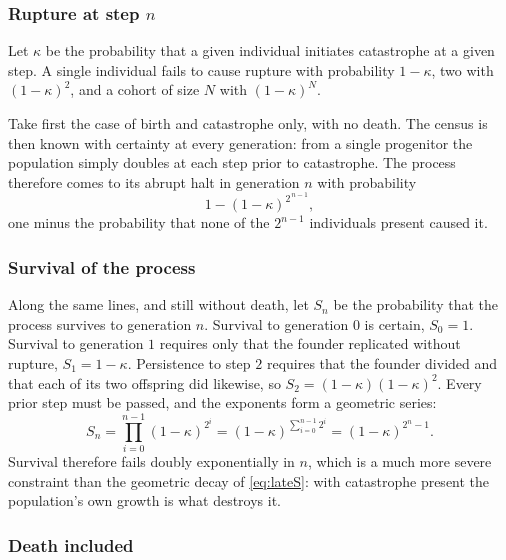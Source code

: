 \subsubsection*{Rupture at step \texorpdfstring{$n$}{n}}

Let $\kappa$ be the probability that a given individual initiates catastrophe at a given
step. A single individual fails to cause rupture with probability $1-\kappa$, two with
$(1-\kappa)^2$, and a cohort of size $N$ with $(1-\kappa)^N$.

Take first the case of birth and catastrophe only, with no death. The census is then
known with certainty at every generation: from a single progenitor the population simply
doubles at each step prior to catastrophe. The process therefore comes to its abrupt halt
in generation $n$ with probability
\begin{equation}
\label{eq:bdcrupture}
1-(1-\kappa)^{2^{\,n-1}},
\end{equation}
one minus the probability that none of the $2^{n-1}$ individuals present caused it.

\subsubsection*{Survival of the process}

Along the same lines, and still without death, let $S_n$ be the probability that the
process survives to generation $n$. Survival to generation $0$ is certain, $S_0=1$.
Survival to generation $1$ requires only that the founder replicated without rupture,
$S_1 = 1-\kappa$. Persistence to step $2$ requires that the founder divided and that each
of its two offspring did likewise, so $S_2 = (1-\kappa)(1-\kappa)^2$. Every prior step
must be passed, and the exponents form a geometric series:
\begin{equation}
\label{eq:bdcS}
S_n = \prod_{i=0}^{n-1}(1-\kappa)^{2^i}
= (1-\kappa)^{\sum_{i=0}^{n-1}2^i}
= (1-\kappa)^{2^n-1} .
\end{equation}
Survival therefore fails doubly exponentially in $n$, which is a much more severe
constraint than the geometric decay of \cref{eq:lateS}: with catastrophe present the
population's own growth is what destroys it.

\subsubsection*{Death included}

